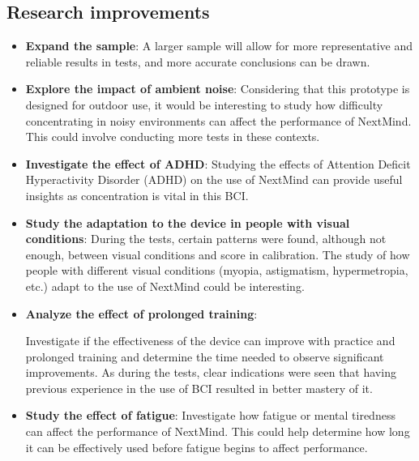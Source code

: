 \subsection{Research improvements}

\begin{itemize}
\item \textbf{Expand the sample}: A larger sample will allow for more representative and reliable results in tests, and more accurate conclusions can be drawn.

\item \textbf{Explore the impact of ambient noise}: Considering that this prototype is designed for outdoor use, it would be interesting to study how difficulty concentrating in noisy environments can affect the performance of NextMind. This could involve conducting more tests in these contexts.

\item \textbf{Investigate the effect of ADHD}: Studying the effects of Attention Deficit Hyperactivity Disorder (ADHD) on the use of NextMind can provide useful insights as concentration is vital in this BCI.

\item \textbf{Study the adaptation to the device in people with visual conditions}: 
During the tests, certain patterns were found, although not enough, between visual conditions and score in calibration. The study of how people with different visual conditions (myopia, astigmatism, hypermetropia, etc.) adapt to the use of NextMind could be interesting.

\item \textbf{Analyze the effect of prolonged training}:

 Investigate if the effectiveness of the device can improve with practice and prolonged training and determine the time needed to observe significant improvements. As during the tests, clear indications were seen that having previous experience in the use of BCI resulted in better mastery of it.

\item \textbf{Study the effect of fatigue}: Investigate how fatigue or mental tiredness can affect the performance of NextMind. This could help determine how long it can be effectively used before fatigue begins to affect performance.

\end{itemize}